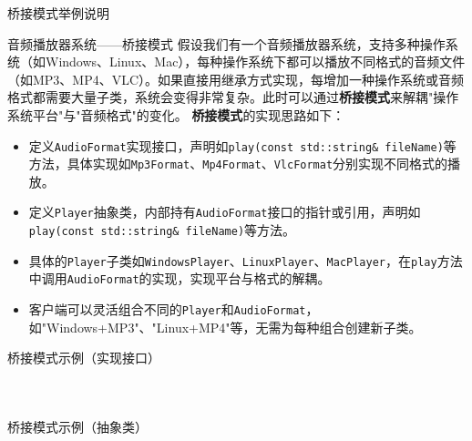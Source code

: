 \documentclass[UTF8,aspectratio=169]{beamer}
\begin{document}
\begin{frame}{桥接模式举例说明}
    \begin{exampleytublock}{音频播放器系统——桥接模式}
        假设我们有一个音频播放器系统，支持多种操作系统（如Windows、Linux、Mac），每种操作系统下都可以播放不同格式的音频文件（如MP3、MP4、VLC）。如果直接用继承方式实现，每增加一种操作系统或音频格式都需要大量子类，系统会变得非常复杂。此时可以通过\textbf{桥接模式}来解耦"操作系统平台"与"音频格式"的变化。
        \textbf{桥接模式}的实现思路如下：
        \begin{itemize}
            \item 定义\texttt{AudioFormat}实现接口，声明如\texttt{play(const std::string\& fileName)}等方法，具体实现如\texttt{Mp3Format}、\texttt{Mp4Format}、\texttt{VlcFormat}分别实现不同格式的播放。
            \item 定义\texttt{Player}抽象类，内部持有\texttt{AudioFormat}接口的指针或引用，声明如\texttt{play(const std::string\& fileName)}等方法。
            \item 具体的\texttt{Player}子类如\texttt{WindowsPlayer}、\texttt{LinuxPlayer}、\texttt{MacPlayer}，在\texttt{play}方法中调用\texttt{AudioFormat}的实现，实现平台与格式的解耦。
            \item 客户端可以灵活组合不同的\texttt{Player}和\texttt{AudioFormat}，如"Windows+MP3"、"Linux+MP4"等，无需为每种组合创建新子类。
        \end{itemize}
    \end{exampleytublock}
\end{frame}

\begin{frame}{桥接模式示例（实现接口）}
    \begin{columns}
        \begin{column}{0.48\textwidth}
            \inputminted[firstline=1, lastline=20]{cpp}{code/bridge_pattern.cpp}
        \end{column}
        \begin{column}{0.48\textwidth}
            \inputminted[firstline=21, lastline=37]{cpp}{code/bridge_pattern.cpp}
        \end{column}
    \end{columns}
\end{frame}

\begin{frame}{桥接模式示例（抽象类）}
    \begin{columns}
        \begin{column}{0.48\textwidth}
            \inputminted[firstline=39, lastline=57]{cpp}{code/bridge_pattern.cpp}
        \end{column}
        \begin{column}{0.48\textwidth}
            \inputminted[firstline=59, lastline=77]{cpp}{code/bridge_pattern.cpp}
        \end{column}
    \end{columns}
\end{frame}
\end{document}
